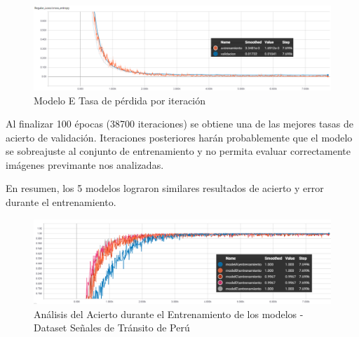			\begin{figure}[H]
				\begin{center}
				\includegraphics[width=1\textwidth]{images/desarrollo/trainResults/peru/model7Loss} 
				\end{center}
				\begin{center}
				\caption{\small{Modelo E Tasa de pérdida por iteración}}
				
				{\small{\fontsize{10}{16.8}\selectfont {Fuente: Elaboración propia}}}
				\end{center}
				\vspace{-1.5em}
			\end{figure}
		
			Al finalizar 100 épocas (38700 iteraciones) se obtiene una de las mejores tasas de acierto de validación. Iteraciones posteriores harán probablemente que el modelo se sobreajuste al conjunto de entrenamiento y no permita evaluar correctamente imágenes previmante nos analizadas.


		\newpage
		En resumen, los 5 modelos lograron similares resultados de acierto y error durante el entrenamiento. 

			\begin{figure}[H]
				\includegraphics[width=1\textwidth, height=\textheight,keepaspectratio]{images/desarrollo/trainResults/peruSummary_entreAcierto} 
				\begin{center}
				\caption{\small{Análisis del Acierto durante el Entrenamiento de los modelos - Dataset Señales de Tránsito de Perú}}
				
				{\small{\fontsize{10}{16.8}\selectfont {Fuente: Elaboración propia}}}
				\end{center}
				\vspace{-1.5em}
			\end{figure}	

